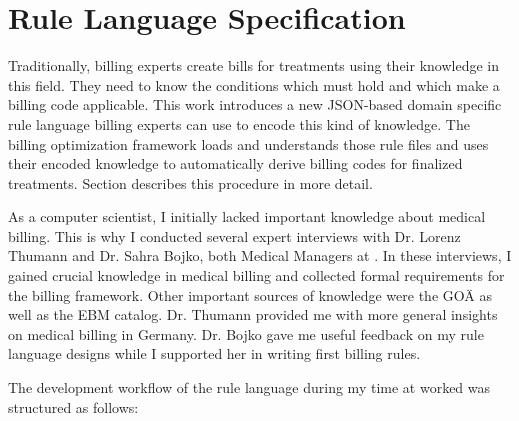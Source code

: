 \section{Rule Language Specification}\label{sec:rule-language-specification}

Traditionally, billing experts create bills for treatments using their knowledge in this field.
They need to know the conditions which must hold and which make a billing code applicable.
This work introduces a new JSON-based domain specific rule language billing experts can use to encode this kind of knowledge.
The billing optimization framework loads and understands those rule files and uses their encoded knowledge to automatically derive billing codes for finalized treatments.
Section  describes this procedure in more detail.

As a computer scientist, I initially lacked important knowledge about medical billing.
This is why I conducted several expert interviews with Dr. Lorenz Thumann and Dr. Sahra Bojko, both Medical Managers at \AV.
In these interviews, I gained crucial knowledge in medical billing and collected formal requirements for the billing framework.
Other important sources of knowledge were the GOÄ as well as the EBM catalog.
Dr. Thumann provided me with more general insights on medical billing in Germany.
Dr. Bojko gave me useful feedback on my rule language designs while I supported her in writing first billing rules.

The development workflow of the rule language during my time at \AV worked was structured as follows:

